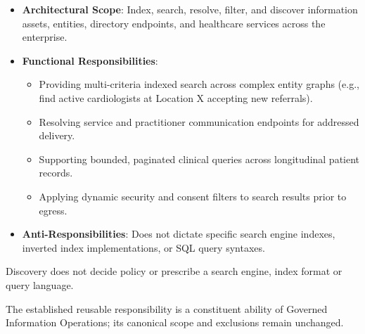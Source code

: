
\begin{itemize}

\item
\textbf{Architectural Scope}: Index, search, resolve, filter, and discover information assets, entities, directory endpoints, and healthcare services across the enterprise.



\item
\textbf{Functional Responsibilities}:


\begin{itemize}

\item
Providing multi-criteria indexed search across complex entity graphs (e.g., find active cardiologists at Location X accepting new referrals).



\item
Resolving service and practitioner communication endpoints for addressed delivery.



\item
Supporting bounded, paginated clinical queries across longitudinal patient records.



\item
Applying dynamic security and consent filters to search results prior to egress.



\end{itemize}


\item
\textbf{Anti-Responsibilities}: Does not dictate specific search engine indexes, inverted index implementations, or SQL query syntaxes.



\end{itemize}


Discovery does not decide policy or prescribe a search engine, index format or query language.



The established reusable responsibility is a constituent ability of Governed Information Operations; its canonical scope and exclusions remain unchanged.


